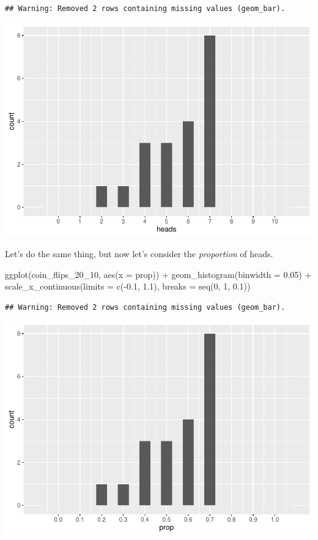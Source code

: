 \documentclass[
]{book}
\newenvironment{Shaded}{\begin{snugshade}}{\end{snugshade}}
\newcommand{\AttributeTok}[1]{\textcolor[rgb]{0.77,0.63,0.00}{#1}}
\newcommand{\DecValTok}[1]{\textcolor[rgb]{0.00,0.00,0.81}{#1}}
\newcommand{\FloatTok}[1]{\textcolor[rgb]{0.00,0.00,0.81}{#1}}
\newcommand{\FunctionTok}[1]{\textcolor[rgb]{0.00,0.00,0.00}{#1}}
\newcommand{\NormalTok}[1]{#1}
\newcommand{\SpecialCharTok}[1]{\textcolor[rgb]{0.00,0.00,0.00}{#1}}
\begin{document}
\begin{verbatim}
## Warning: Removed 2 rows containing missing values (geom_bar).
\end{verbatim}

\includegraphics{intro_stats_files/figure-latex/unnamed-chunk-216-1.pdf}

Let's do the same thing, but now let's consider the \emph{proportion} of heads.

\begin{Shaded}
\begin{Highlighting}[]
\FunctionTok{ggplot}\NormalTok{(coin\_flips\_20\_10, }\FunctionTok{aes}\NormalTok{(}\AttributeTok{x =}\NormalTok{ prop)) }\SpecialCharTok{+}
    \FunctionTok{geom\_histogram}\NormalTok{(}\AttributeTok{binwidth =} \FloatTok{0.05}\NormalTok{) }\SpecialCharTok{+}
    \FunctionTok{scale\_x\_continuous}\NormalTok{(}\AttributeTok{limits =} \FunctionTok{c}\NormalTok{(}\SpecialCharTok{{-}}\FloatTok{0.1}\NormalTok{, }\FloatTok{1.1}\NormalTok{), }\AttributeTok{breaks =} \FunctionTok{seq}\NormalTok{(}\DecValTok{0}\NormalTok{, }\DecValTok{1}\NormalTok{, }\FloatTok{0.1}\NormalTok{))}
\end{Highlighting}
\end{Shaded}

\begin{verbatim}
## Warning: Removed 2 rows containing missing values (geom_bar).
\end{verbatim}

\includegraphics{intro_stats_files/figure-latex/unnamed-chunk-217-1.pdf}
\end{document}
